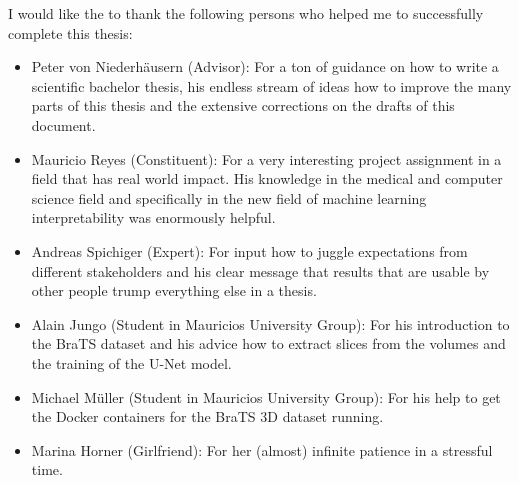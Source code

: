 I would like the to thank the following persons who helped me to successfully complete this thesis:

\begin{itemize}
    \item Peter von Niederhäusern (Advisor): For a ton of guidance on how to write a scientific bachelor thesis, his endless stream of ideas how to improve the many parts of this thesis and the extensive corrections on the drafts of this document.
    \item Mauricio Reyes (Constituent): For a very interesting project assignment in a field that has real world impact. His knowledge in the medical and computer science field and specifically in the new field of machine learning interpretability was enormously helpful.
    \item Andreas Spichiger (Expert): For input how to juggle expectations from different stakeholders and his clear message that results that are usable by other people trump everything else in a thesis.
    \item Alain Jungo (Student in Mauricios University Group): For his introduction to the BraTS dataset and his advice how to extract slices from the volumes and the training of the U-Net model.
    \item Michael Müller (Student in Mauricios University Group): For his help to get the Docker containers for the BraTS 3D dataset running.
    \item Marina Horner (Girlfriend): For her (almost) infinite patience in a stressful time.
\end{itemize}
